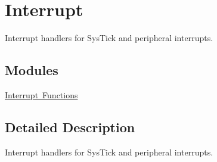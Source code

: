 \hypertarget{group___s_d___interrupt}{}\section{Interrupt}
\label{group___s_d___interrupt}


Interrupt handlers for Sys\+Tick and peripheral interrupts.  


\subsection*{Modules}
\begin{DoxyCompactItemize}
\item 
\mbox{\hyperlink{group___s_d___interrupt___functions}{Interrupt Functions}}
\end{DoxyCompactItemize}


\subsection{Detailed Description}
Interrupt handlers for Sys\+Tick and peripheral interrupts. 


